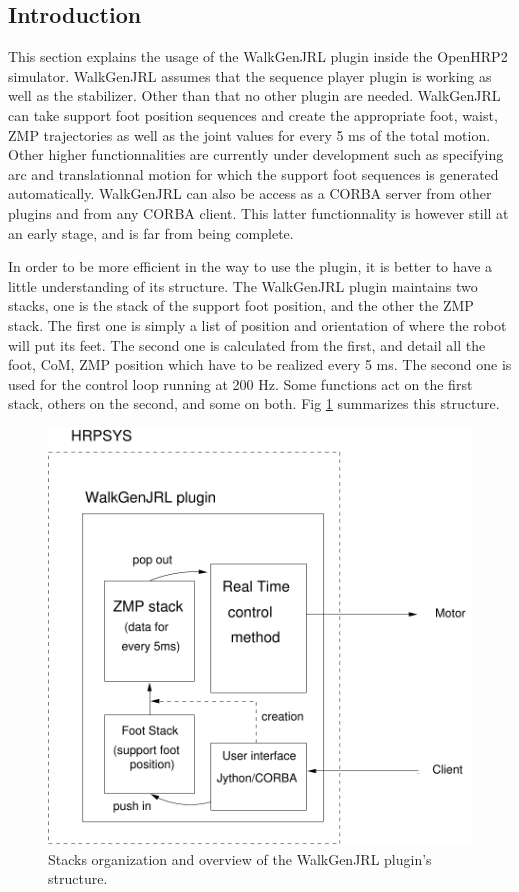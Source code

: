 \subsection{Introduction}
This section explains the usage of the WalkGenJRL plugin inside the OpenHRP2 simulator.
WalkGenJRL assumes that the sequence player plugin is working as well as the stabilizer.
Other than that no other plugin are needed.
WalkGenJRL can take support foot position sequences and create the appropriate foot, waist, ZMP trajectories
as well as the joint values for every 5 ms of the total motion.
Other higher functionnalities are currently under development such as specifying arc and 
translationnal motion for which the support foot sequences is generated automatically.
WalkGenJRL can also be access as a CORBA server from other plugins and from 
any CORBA client. This latter functionnality is however still at an early stage, 
and is far from being complete.
\par
In order to be more efficient in the way to use the  plugin, it is better to have a little understanding of
its structure. The WalkGenJRL plugin maintains two stacks, one is the stack of the support foot position,
and the other the ZMP stack. The first one is simply a list of position and orientation of where the robot will
put its feet. The second one is calculated from the first, and detail all the foot, CoM, ZMP position
which have to be realized every 5 ms. The second one is used for the control loop running at 200 Hz.
Some functions act on the first stack, others on the second, and some on both.
Fig \ref{pic:Stacks} summarizes this structure.
\begin{figure}[htb]
\begin{center}
\includegraphics[width=0.7\linewidth]{./figures/PatternGenerator/Stacks}
\caption{Stacks organization and overview of the WalkGenJRL plugin's structure.}
\label{pic:Stacks}
\end{center}
\end{figure}

